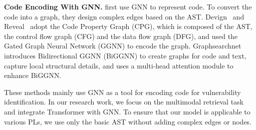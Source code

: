 \noindent 
\textbf{Code Encoding With GNN.}
\citet{allamanis2017learning} first use GNN to represent code. To convert the code into a graph, they design complex edges based on the AST. Devign~\citep{zhou2019devign} and Reveal~\citep{chakraborty2021deep} adopt the Code Property Graph (CPG), which is composed of the AST, the control flow graph (CFG) and the data flow graph (DFG), and used the Gated Graph Neural Network (GGNN) to encode the graph. 
Graphsearchnet~\citep{liu2023graphsearchnet} introduces Bidirectional GGNN (BiGGNN) to create graphs for code and text, capture local structural details, and uses a multi-head attention module to enhance BiGGNN.

These methods mainly use GNN as a tool for encoding code for vulnerability identification. In our research work, we focus on the multimodal retrieval task and integrate Transformer with GNN.
To ensure that our model is applicable to various PLs, we use only the basic AST without adding complex edges or nodes. 

